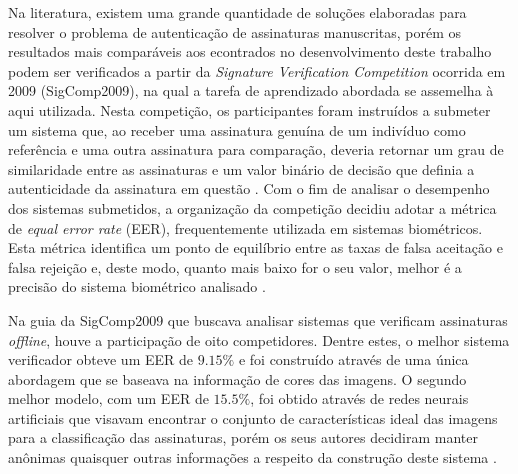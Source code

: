 
Na literatura, existem uma grande quantidade de soluções elaboradas para resolver o problema de autenticação de assinaturas manuscritas, porém os resultados mais comparáveis aos econtrados no desenvolvimento deste trabalho podem ser verificados a partir da \emph{Signature Verification Competition} ocorrida em 2009 (SigComp2009), na qual a tarefa de aprendizado abordada se assemelha à aqui utilizada. Nesta competição, os participantes foram instruídos a submeter um sistema que, ao receber uma assinatura genuína de um indivíduo como referência e uma outra assinatura para comparação, deveria retornar um grau de similaridade entre as assinaturas e um valor binário de decisão que definia a autenticidade da assinatura em questão \cite{icdar2009}. Com o fim de analisar o desempenho dos sistemas submetidos, a organização da competição decidiu adotar a métrica de \emph{equal error rate} (EER), frequentemente utilizada em sistemas biométricos. Esta métrica identifica um ponto de equilíbrio entre as taxas de falsa aceitação e falsa rejeição e, deste modo, quanto mais baixo for o seu valor, melhor é a precisão do sistema biométrico analisado \cite{capsi}.

Na guia da SigComp2009 que buscava analisar sistemas que verificam assinaturas \emph{offline}, houve a participação de oito competidores. Dentre estes, o melhor sistema verificador obteve um EER de $9.15\%$ e foi construído através de uma única abordagem que se baseava na informação de cores das imagens. O segundo melhor modelo, com um EER de $15.5\%$, foi obtido através de redes neurais artificiais que visavam encontrar o conjunto de características ideal das imagens para a classificação das assinaturas, porém os seus autores decidiram manter anônimas quaisquer outras informações a respeito da construção deste sistema \cite{icdar2009, volker}.

